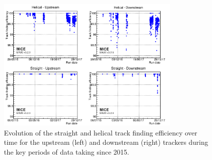 \begin{figure}
  \centering
  \includegraphics[width=0.80\textwidth]{historical_analysis_plot_logo.png}
  \caption{\label{fig:trackers:performance:historical} Evolution of the straight and helical track finding efficiency over time for the upstream (left) and downstream (right) trackers during the key periods of data taking since 2015.}
\end{figure}
